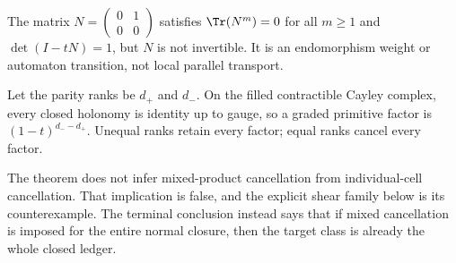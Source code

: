 \begin{corollary}
\label{cor:nilpotent}
The matrix $N=\left(\begin{smallmatrix}0&1\\0&0\end{smallmatrix}\right)$
satisfies $\Tr(N^m)=0$ for all $m\ge1$ and $\det(I-tN)=1$, but $N$ is not
invertible.  It is an endomorphism weight or automaton transition, not local
parallel transport.
\end{corollary}

\begin{corollary}
\label{cor:flat}
Let the parity ranks be $d_+$ and $d_-$.  On the filled contractible Cayley
complex, every closed holonomy is identity up to gauge, so a graded primitive
factor is $(1-t)^{d_--d_+}$.  Unequal ranks retain every factor; equal ranks
cancel every factor.
\end{corollary}

The theorem does not infer mixed-product cancellation from individual-cell
cancellation.  That implication is false, and the explicit shear family below
is its counterexample.  The terminal conclusion instead says that if mixed
cancellation is imposed for the entire normal closure, then the target class
is already the whole closed ledger.
